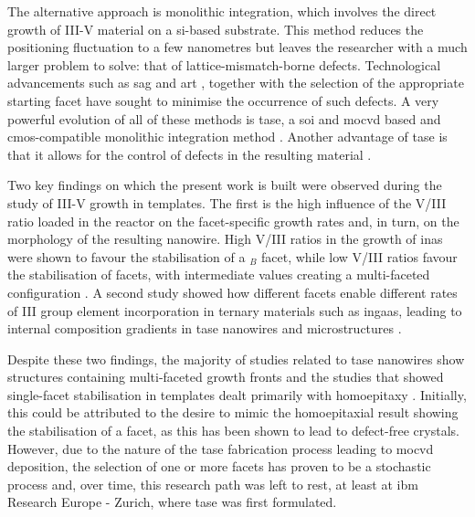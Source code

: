 The alternative approach is monolithic integration, which involves the direct growth of III-V material on a \acl{si}-based substrate. This method reduces the positioning fluctuation to a few nanometres but leaves the researcher with a much larger problem to solve: that of lattice-mismatch-borne defects. Technological advancements such as \acf{sag} and \acf{art} \cite{Kunert2016, Fiorenza2019}, together with the selection of the appropriate starting facet \cite{Kunert2018} have sought to minimise the occurrence of such defects. A very powerful evolution of all of these methods is \acf{tase}, a \acf{soi} and \acf{mocvd} based and \acs{cmos}-compatible \cite{Svensson2023} monolithic integration method \cite{borgTASEp2018, Schmid2015}. Another advantage of \acs{tase} is that it allows for the control of defects in the resulting material \cite{Knoedler2017, Staudinger2018, Han2020}. 

Two key findings on which the present work is built were observed during the study of III-V growth in templates. The first is the high influence of the V/III ratio loaded in the reactor on the facet-specific growth rates and, in turn, on the morphology of the resulting nanowire. High V/III ratios in the growth of \acs{inas} were shown to favour the stabilisation of a \(_B\) facet, while low V/III ratios favour the stabilisation of  facets, with intermediate values creating a multi-faceted configuration \cite{Borg2015}. A second study showed how different facets enable different rates of III group element incorporation in ternary materials such as \acs{ingaas}, leading to internal composition gradients in \acs{tase} nanowires and microstructures \cite{Borg2019}.

Despite these two findings, the majority of studies related to \acs{tase} nanowires show structures containing multi-faceted growth fronts \cite{Knoedler2017, Han2016, Yan2021, Scherrer2024, Xue2021, Wen2022} and the studies that showed single-facet stabilisation in templates dealt primarily with homoepitaxy \cite{Goswami2020, Brunelli2019}. Initially, this could be attributed to the desire to mimic the homoepitaxial result showing the stabilisation of a  facet, as this has been shown to lead to defect-free crystals. However, due to the nature of the \acs{tase} fabrication process leading to \acs{mocvd} deposition, the selection of one or more  facets has proven to be a stochastic process \cite{Knoedler2017} and, over time, this research path was left to rest, at least at \acs{ibm} Research Europe - Zurich, where \acs{tase} was first formulated.

